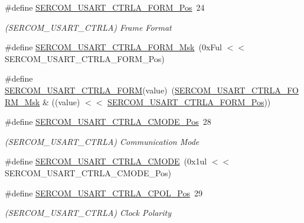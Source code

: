 \begin{DoxyCompactItemize}
\item 
\#define \mbox{\hyperlink{group___s_a_m_d21___s_e_r_c_o_m_ga66b6fc1b386596d5426091b7e85171fa}{S\+E\+R\+C\+O\+M\+\_\+\+U\+S\+A\+R\+T\+\_\+\+C\+T\+R\+L\+A\+\_\+\+F\+O\+R\+M\+\_\+\+Pos}}~24
\begin{DoxyCompactList}\small\item\em (S\+E\+R\+C\+O\+M\+\_\+\+U\+S\+A\+R\+T\+\_\+\+C\+T\+R\+LA) Frame Format \end{DoxyCompactList}\item 
\#define \mbox{\hyperlink{group___s_a_m_d21___s_e_r_c_o_m_gaf5d5903c3974c1e086bb35ca7ea48c63}{S\+E\+R\+C\+O\+M\+\_\+\+U\+S\+A\+R\+T\+\_\+\+C\+T\+R\+L\+A\+\_\+\+F\+O\+R\+M\+\_\+\+Msk}}~(0x\+Ful $<$$<$ S\+E\+R\+C\+O\+M\+\_\+\+U\+S\+A\+R\+T\+\_\+\+C\+T\+R\+L\+A\+\_\+\+F\+O\+R\+M\+\_\+\+Pos)
\item 
\#define \mbox{\hyperlink{group___s_a_m_d21___s_e_r_c_o_m_ga79e17f6dc8a1219b1f95707e10eac9f4}{S\+E\+R\+C\+O\+M\+\_\+\+U\+S\+A\+R\+T\+\_\+\+C\+T\+R\+L\+A\+\_\+\+F\+O\+RM}}(value)~(\mbox{\hyperlink{group___s_a_m_d21___s_e_r_c_o_m_gaf5d5903c3974c1e086bb35ca7ea48c63}{S\+E\+R\+C\+O\+M\+\_\+\+U\+S\+A\+R\+T\+\_\+\+C\+T\+R\+L\+A\+\_\+\+F\+O\+R\+M\+\_\+\+Msk}} \& ((value) $<$$<$ \mbox{\hyperlink{group___s_a_m_d21___s_e_r_c_o_m_ga66b6fc1b386596d5426091b7e85171fa}{S\+E\+R\+C\+O\+M\+\_\+\+U\+S\+A\+R\+T\+\_\+\+C\+T\+R\+L\+A\+\_\+\+F\+O\+R\+M\+\_\+\+Pos}}))
\item 
\#define \mbox{\hyperlink{group___s_a_m_d21___s_e_r_c_o_m_gad98b1700e833ae1e4433b54c5d96333a}{S\+E\+R\+C\+O\+M\+\_\+\+U\+S\+A\+R\+T\+\_\+\+C\+T\+R\+L\+A\+\_\+\+C\+M\+O\+D\+E\+\_\+\+Pos}}~28
\begin{DoxyCompactList}\small\item\em (S\+E\+R\+C\+O\+M\+\_\+\+U\+S\+A\+R\+T\+\_\+\+C\+T\+R\+LA) Communication Mode \end{DoxyCompactList}\item 
\#define \mbox{\hyperlink{group___s_a_m_d21___s_e_r_c_o_m_gaa7e612a64e92fcd39eb4f2f9a953cd25}{S\+E\+R\+C\+O\+M\+\_\+\+U\+S\+A\+R\+T\+\_\+\+C\+T\+R\+L\+A\+\_\+\+C\+M\+O\+DE}}~(0x1ul $<$$<$ S\+E\+R\+C\+O\+M\+\_\+\+U\+S\+A\+R\+T\+\_\+\+C\+T\+R\+L\+A\+\_\+\+C\+M\+O\+D\+E\+\_\+\+Pos)
\item 
\#define \mbox{\hyperlink{group___s_a_m_d21___s_e_r_c_o_m_gac0128d4edc5d1dcc9ab8a47b4df89d2b}{S\+E\+R\+C\+O\+M\+\_\+\+U\+S\+A\+R\+T\+\_\+\+C\+T\+R\+L\+A\+\_\+\+C\+P\+O\+L\+\_\+\+Pos}}~29
\begin{DoxyCompactList}\small\item\em (S\+E\+R\+C\+O\+M\+\_\+\+U\+S\+A\+R\+T\+\_\+\+C\+T\+R\+LA) Clock Polarity \end{DoxyCompactList}\item 
$$
\end{DoxyCompactItemize}
